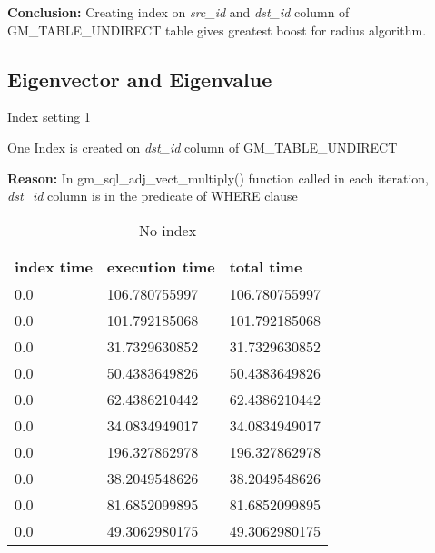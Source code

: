 \par \textbf{Conclusion:} Creating index on \textit{src\_id} and \textit{dst\_id} column of GM\_TABLE\_UNDIRECT table gives greatest boost for radius algorithm.

\subsection{Eigenvector and Eigenvalue}
\begin{itemize*}
\item{Index setting 1}
\par One Index is created on \textit{dst\_id} column of GM\_TABLE\_UNDIRECT
\par \textbf{Reason:} In gm\_sql\_adj\_vect\_multiply() function called in each iteration, \textit{dst\_id} column is in the predicate of WHERE clause

\begin{table}[H]
\begin{center}
\begin{tabular}{|l|l|l|}
\hline
index time & execution time & total time     \\ \hline
0.0 & 106.780755997 & 106.780755997 \\ \hline
0.0 & 101.792185068 & 101.792185068 \\ \hline
0.0 & 31.7329630852 & 31.7329630852 \\ \hline
0.0 & 50.4383649826 & 50.4383649826 \\ \hline
0.0 & 62.4386210442 & 62.4386210442 \\ \hline
0.0 & 34.0834949017 & 34.0834949017 \\ \hline
0.0 & 196.327862978 & 196.327862978 \\ \hline
0.0 & 38.2049548626 & 38.2049548626 \\ \hline
0.0 & 81.6852099895 & 81.6852099895 \\ \hline
0.0 & 49.3062980175 & 49.3062980175 \\ \hline
\end{tabular}
\end{center}
\caption{No index}
\end{table}


\end{itemize*}
